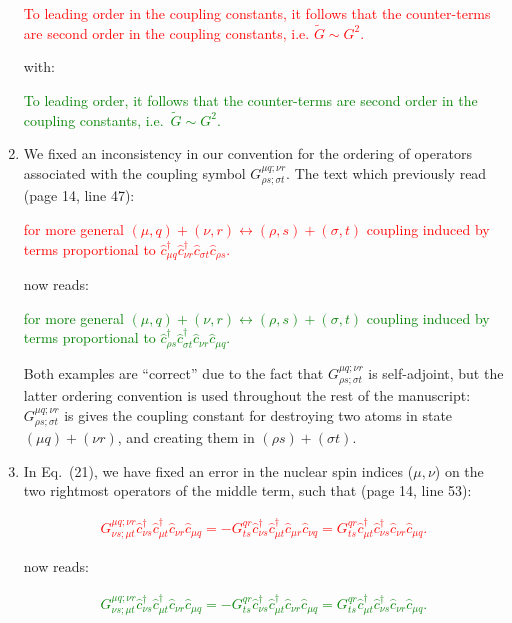 \documentclass[preprint]{revtex4-1}
\newcommand{\p}[1]{\left(#1\right)} %
\renewcommand{\c}{\hat{c}}
\newcommand{\1}{\mathds{1}}
\newcommand{\red}[1]{\textcolor{red}{#1}}
\newcommand{\green}[1]{\textcolor{green}{#1}}
\begin{document}
\begin{enumerate}[label=(R3.\arabic*)]
  \red{To leading order in the coupling constants, it follows that the
    counter-terms are second order in the coupling constants,
    i.e. $\tilde G\sim G^2$.}

  with:

  \green{To leading order, it follows that the counter-terms are
    second order in the coupling constants, i.e.~$\tilde G\sim G^2$.}


\item We fixed an inconsistency in our convention for the ordering of
  operators associated with the coupling symbol
  $G^{\mu q;\nu r}_{\rho s;\sigma t}$.  The text which previously read
  (page 14, line 47):

  \red{for more general
    $\p{\mu,q}+\p{\nu,r}\leftrightarrow\p{\rho,s}+\p{\sigma,t}$
    coupling induced by terms proportional to
    $\c_{\mu q}^\dag \c_{\nu r}^\dag \c_{\sigma t} \c_{\rho s}$.}

  now reads:

  \green{for more general
    $\p{\mu,q}+\p{\nu,r}\leftrightarrow\p{\rho,s}+\p{\sigma,t}$
    coupling induced by terms proportional to
    $\c_{\rho s}^\dag \c_{\sigma t}^\dag \c_{\nu r} \c_{\mu q}$.}

  Both examples are ``correct'' due to the fact that
  $G^{\mu q;\nu r}_{\rho s;\sigma t}$ is self-adjoint, but the latter
  ordering convention is used throughout the rest of the manuscript:
  $G^{\mu q;\nu r}_{\rho s;\sigma t}$ is gives the coupling constant
  for destroying two atoms in state $\p{\mu q}+\p{\nu r}$, and
  creating them in $\p{\rho s}+\p{\sigma t}$.


\item In Eq.~(21), we have fixed an error in the nuclear spin indices
  ($\mu,\nu$) on the two rightmost operators of the middle term, such
  that (page 14, line 53):

  \red{\begin{align*}
      G^{\mu q;\nu r}_{\nu s;\mu t}
      \c_{\nu s}^\dag \c_{\mu t}^\dag \c_{\nu r} \c_{\mu q}
      = -G^{qr}_{ts} \c_{\nu s}^\dag \c_{\mu t}^\dag \c_{\mu r} \c_{\nu q}
      = G^{qr}_{ts} \c_{\mu t}^\dag \c_{\nu s}^\dag \c_{\nu r} \c_{\mu q}.
      \tag{21}
    \end{align*}}

  now reads:

  \green{\begin{align*}
      G^{\mu q;\nu r}_{\nu s;\mu t}
      \c_{\nu s}^\dag \c_{\mu t}^\dag \c_{\nu r} \c_{\mu q}
      = -G^{qr}_{ts} \c_{\nu s}^\dag \c_{\mu t}^\dag \c_{\nu r} \c_{\mu q}
      = G^{qr}_{ts} \c_{\mu t}^\dag \c_{\nu s}^\dag \c_{\nu r} \c_{\mu q}.
      \tag{21}
    \end{align*}}



\end{enumerate}
\end{document}
